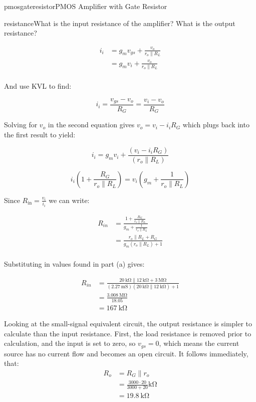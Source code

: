 \begin{mainquestion}{pmosgateresistor}{PMOS Amplifier with Gate Resistor}
\begin{partquestion}{resistance}{What is the input resistance of the amplifier? What is the output resistance?}
\begin{answer}
\begin{align*}
    i_i &= g_m v_{gs} + \frac{v_o}{r_o \parallel R_L} \\
    &= g_m v_i + \frac{v_o}{r_o \parallel R_L} \\ 
\end{align*}

And use KVL to find:

\[
i_{i} = \frac{v_{gs} - v_{o}}{R_{G}} = \frac{v_{i} - v_{o}}{R_{G}}
\]

Solving for $v_{o}$ in the second equation gives $v_{o} = v_{i} - i_{i}R_{G}$ which plugs back into the first result to yield:

\[
i_{i} = g_{m}v_{i} + \frac{(v_{i} - i_{i}R_{G})}{(r_{o} \parallel R_{L})}
\]

\[
i_{i}\left(1 + \frac{R_{G}}{r_{o} \parallel R_{L}}\right) = v_{i}\left(g_{m} + \frac{1}{r_{o} \parallel R_{L}}\right)
\]

Since $R_{\text{in}} = \frac{v_{i}}{i_{i}}$ we can write:

\begin{align*}
    R_{in} &= \frac{1 + \frac{R_G}{r_o \parallel R_L}}{g_m + \frac{1}{r_o \parallel R_L}} \\
    &= \frac{r_o \parallel R_L + R_G}{g_m (r_o \parallel R_L) + 1} \\
\end{align*}

Substituting in values found in part (a) gives:

\begin{align*}
    R_{in} &= \frac{\qty{20}{\kilo\ohm} \parallel \qty{12}{\kilo\ohm} + \qty{3}{\mega\ohm}}{(\qty{2.27}{\milli\siemens}) (\qty{20}{\kilo\ohm} \parallel \qty{12}{\kilo\ohm}) + 1} \\
    &= \frac{\qty{3.008}{\mega\ohm}}{18.05} \\
    &= \qty{167}{\kilo\ohm}
\end{align*}

Looking at the small-signal equivalent circuit, the output resistance is simpler to calculate than the input resistance. First, the load resistance is removed prior to calculation, and the input is set to zero, so $v_{gs} = 0$, which means the current source has no current flow and becomes an open circuit. It follows immediately, that:
\begin{align*}
    R_o &= R_G \parallel r_o \\
    &= \frac{3000 \cdot 20}{3000 + 20} \unit{\kilo\ohm} \\
    &= \qty{19.8}{\kilo\ohm}
\end{align*}
\end{answer}
\end{partquestion}


\end{mainquestion}
